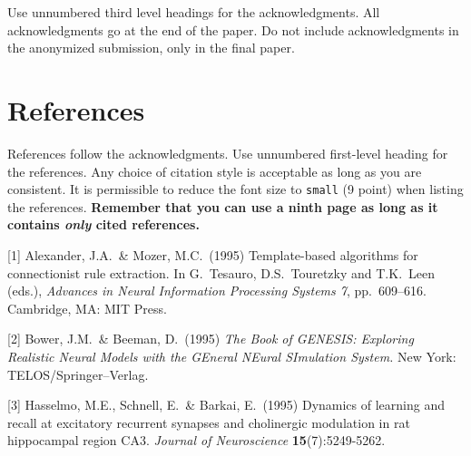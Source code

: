 \documentclass{article}
\begin{document}
Use unnumbered third level headings for the acknowledgments. All
acknowledgments go at the end of the paper. Do not include
acknowledgments in the anonymized submission, only in the final paper.

\section*{References}

References follow the acknowledgments. Use unnumbered first-level
heading for the references. Any choice of citation style is acceptable
as long as you are consistent. It is permissible to reduce the font
size to \verb+small+ (9 point) when listing the references. {\bf
  Remember that you can use a ninth page as long as it contains
  \emph{only} cited references.}
\medskip

\small

[1] Alexander, J.A.\ \& Mozer, M.C.\ (1995) Template-based algorithms
for connectionist rule extraction. In G.\ Tesauro, D.S.\ Touretzky and
T.K.\ Leen (eds.), {\it Advances in Neural Information Processing
  Systems 7}, pp.\ 609--616. Cambridge, MA: MIT Press.

[2] Bower, J.M.\ \& Beeman, D.\ (1995) {\it The Book of GENESIS:
  Exploring Realistic Neural Models with the GEneral NEural SImulation
  System.}  New York: TELOS/Springer--Verlag.

[3] Hasselmo, M.E., Schnell, E.\ \& Barkai, E.\ (1995) Dynamics of
learning and recall at excitatory recurrent synapses and cholinergic
modulation in rat hippocampal region CA3. {\it Journal of
  Neuroscience} {\bf 15}(7):5249-5262.
\end{document}
